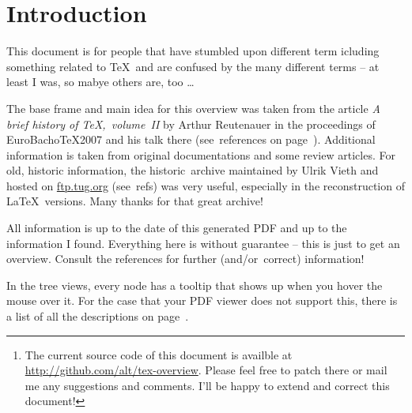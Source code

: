 


\begin{abstract}
{\centering \Large \hyperref[textextview]{Link for the impatient.}\\[2ex]}
In the world of \TeX, there are many developments and ambiguous names. This paper tries to give an overview of the development of \TeX\ and related programs. Contributions are very welcome!\footnote{The current source code of this document is availble at \url{http://github.com/alt/tex-overview}. Please feel free to patch there or mail me any suggestions and comments. I'll be happy to extend and correct this document!}
\end{abstract}

\section*{Introduction}
This document is for people that have stumbled upon different term icluding something related to \TeX\ and are confused by the many different terms – at least I was, so mabye others are, too … 

The base frame and main idea for this overview was taken from the article \textit{A brief history of \TeX,~volume~II} by Arthur Reutenauer in the proceedings of \textsf{EuroBacho\TeX 2007} and his talk there (see~references on page~\pageref{sec:refs}). Additional information is taken from original documentations and some review articles. For old, historic information, the \textsf{historic~archive} maintained by Ulrik Vieth and hosted on \url{ftp.tug.org} (see~refs) was very useful, especially in the reconstruction of \LaTeX\ versions. Many thanks for that great archive!

All information is up to the date of this generated PDF and up to the information I found. Everything here is without guarantee – this is just to get an overview. Consult the references for further (and/or~correct) information! 

In the tree views, every node has a tooltip that shows up when you hover the mouse over it. For the case that your PDF viewer does not support this, there is a list of all the descriptions on page~\pageref{sec:text}.

